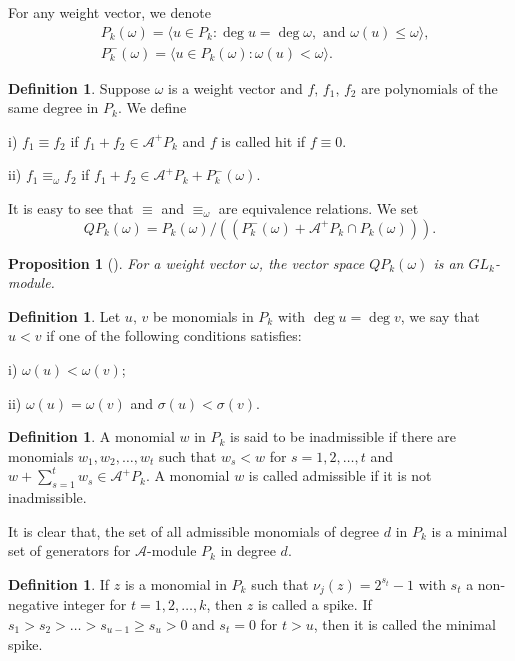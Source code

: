 \documentclass[reqno]{amsart}
\theoremstyle{plain}
\theoremstyle{definition}
\theoremstyle{plain}
\newtheorem{props}[thms]{Proposition}
\theoremstyle{definition}
\newtheorem{defns}[thms]{Definition}
\numberwithin{equation}{section}
\begin{document}
For any weight vector, we denote
\begin{align*}
&P_k(\omega) = \langle u \in P_k: \deg u = \deg\omega,\mbox{ and } \omega(u)\leqslant \omega\rangle,\\ 
&P_k^-(\omega) = \langle u \in P_k(\omega): \omega(u) < \omega\rangle.
\end{align*} 

\begin{defns} Suppose $\omega$ is a weight vector and $f,\, f_1,\, f_2$ are polynomials of the same degree in $P_k$. We define
	
i) $f_1 \equiv f_2$ if $f_1+f_2 \in \mathcal A^+P_k$ and $f$ is called hit if $f \equiv 0$.
	
ii) $f_1 \equiv_{\omega} f_2$ if $f_1 + f_2 \in \mathcal A^+P_k+P_k^-(\omega)$. 
\end{defns}

It is easy to see that $\equiv$ and $\equiv_{\omega}$ are equivalence relations. We set 
$$QP_k(\omega)= P_k(\omega)/ ((P_k^-(\omega)+\mathcal A^+P_k\cap P_k(\omega))).$$   

\begin{props}[\cite{su3}] For a weight vector $\omega$, the vector space $QP_k(\omega)$ is an $GL_k$-module. 
\end{props}

\begin{defns} 
Let $u,\, v$ be monomials in $P_k$ with $\deg u = \deg v$, we say that $u < v$ if one of the following conditions satisfies:  

i) $\omega (u) < \omega(v)$;
	
ii) $\omega (u) = \omega(v)$ and $\sigma(u) < \sigma(v).$
\end{defns}

\begin{defns}\label{dfnad}
A monomial $w$ in $P_k$ is said to be inadmissible if there are monomials $w_1,w_2,\ldots, w_t$ such that $w_s<w$ for $s=1,2,\ldots , t$ and $w + \sum_{s=1}^tw_s \in \mathcal A^+P_k.$ 
A monomial $w$ is called admissible	if it is not inadmissible.
\end{defns} 

It is clear that, the set of all admissible monomials of degree $d$ in $P_k$ is a minimal set of generators for $\mathcal{A}$-module $P_k$ in degree $d$.

\begin{defns}\label{spi}  If $z$ is a monomial in $P_k$ such that $\nu_j(z)=2^{s_t}-1$ with $s_t$ a non-negative integer for $t=1,2, \ldots , k$, then $z$ is called a spike. If $s_1>s_2>\ldots >s_{u-1}\geqslant s_u>0$ and $s_t=0$ for $t>u$, then it is called the minimal spike.
\end{defns}
\end{document}
